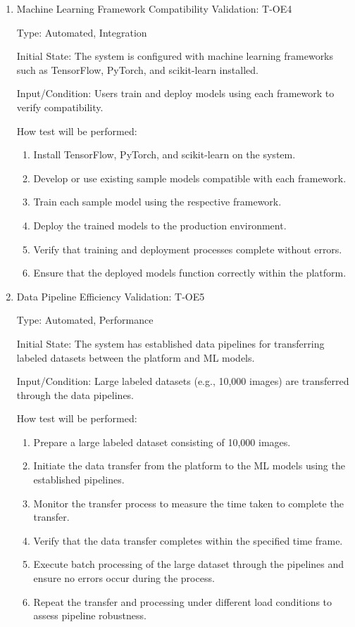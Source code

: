 \documentclass[12pt, titlepage]{article}
\begin{document}
\begin{enumerate}
\item{Machine Learning Framework Compatibility Validation: T-OE4\\}

Type: Automated, Integration

Initial State: The system is configured with machine learning frameworks such as TensorFlow, PyTorch, and scikit-learn installed.

Input/Condition: Users train and deploy models using each framework to verify compatibility.

How test will be performed:
\begin{enumerate}
    \item Install TensorFlow, PyTorch, and scikit-learn on the system.
    \item Develop or use existing sample models compatible with each framework.
    \item Train each sample model using the respective framework.
    \item Deploy the trained models to the production environment.
    \item Verify that training and deployment processes complete without errors.
    \item Ensure that the deployed models function correctly within the platform.
\end{enumerate}

\item{Data Pipeline Efficiency Validation: T-OE5\\}

Type: Automated, Performance

Initial State: The system has established data pipelines for transferring labeled datasets between the platform and ML models.

Input/Condition: Large labeled datasets (e.g., 10,000 images) are transferred through the data pipelines.

How test will be performed:
\begin{enumerate}
    \item Prepare a large labeled dataset consisting of 10,000 images.
    \item Initiate the data transfer from the platform to the ML models using the established pipelines.
    \item Monitor the transfer process to measure the time taken to complete the transfer.
    \item Verify that the data transfer completes within the specified time frame.
    \item Execute batch processing of the large dataset through the pipelines and ensure no errors occur during the process.
    \item Repeat the transfer and processing under different load conditions to assess pipeline robustness.
\end{enumerate}


\end{enumerate}
\end{document}
